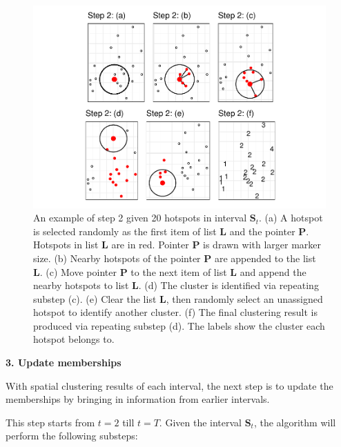\begin{Schunk}
\begin{figure}

{\centering \includegraphics[width=0.8\linewidth]{clustering_paper_files/figure-latex/step2figs-1} 

}

\caption{An example of step 2 given 20 hotspots in interval $\boldsymbol{S}_t$. (a) A hotspot is selected randomly as the first item of list $\boldsymbol{L}$ and the pointer $\boldsymbol{P}$. Hotspots in list $\boldsymbol{L}$ are in red. Pointer $\boldsymbol{P}$ is drawn with larger marker size. (b) Nearby hotspots of the pointer $\boldsymbol{P}$ are appended to the list $\boldsymbol{L}$. (c) Move pointer $\boldsymbol{P}$ to the next item of list $\boldsymbol{L}$ and append the nearby hotspots to list $\boldsymbol{L}$. (d) The cluster is identified via repeating substep (c). (e) Clear the list $\boldsymbol{L}$, then randomly select an unassigned hotspot to identify another cluster. (f) The final clustering result is produced via repeating substep (d). The labels show the cluster each hotspot belongs to.}\label{fig:step2figs}
\end{figure}
\end{Schunk}

\textbf{3. Update memberships}

With spatial clustering results of each interval, the next step is to
update the memberships by bringing in information from earlier
intervals.

This step starts from \(t=2\) till \(t=T\). Given the interval
\(\boldsymbol{S}_t\), the algorithm will perform the following substeps:

